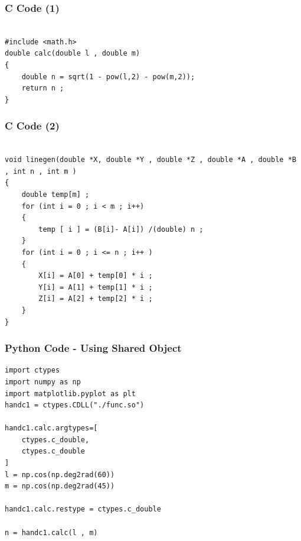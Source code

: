\documentclass{beamer}
\begin{document}
\begin{frame}[fragile]
    \frametitle{C Code (1) }

    \begin{lstlisting}

#include <math.h>
double calc(double l , double m)
{
    double n = sqrt(1 - pow(l,2) - pow(m,2));
    return n ;
}

    \end{lstlisting}
\end{frame}



\begin{frame}[fragile]
    \frametitle{C Code (2)}
    \begin{lstlisting}
    
void linegen(double *X, double *Y , double *Z , double *A , double *B , int n , int m )
{
    double temp[m] ; 
    for (int i = 0 ; i < m ; i++)
    {
        temp [ i ] = (B[i]- A[i]) /(double) n ; 
    }
    for (int i = 0 ; i <= n ; i++ )
    {
        X[i] = A[0] + temp[0] * i ; 
        Y[i] = A[1] + temp[1] * i ;
        Z[i] = A[2] + temp[2] * i ; 
    }
}

\end{lstlisting}
\end{frame}

\begin{frame}[fragile]
    \frametitle{Python Code - Using Shared Object}
    \begin{lstlisting}
import ctypes
import numpy as np
import matplotlib.pyplot as plt
handc1 = ctypes.CDLL("./func.so")

handc1.calc.argtypes=[
    ctypes.c_double,
    ctypes.c_double
]
l = np.cos(np.deg2rad(60))
m = np.cos(np.deg2rad(45))

handc1.calc.restype = ctypes.c_double

n = handc1.calc(l , m)
\end{lstlisting}
\end{frame}
\end{document}
